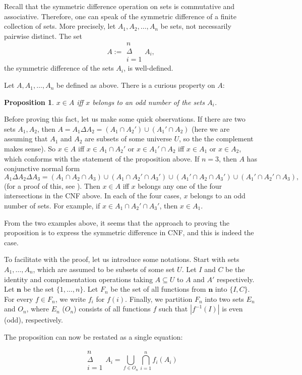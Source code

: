 \documentclass[12pt]{article}
\newtheorem{prop}{Proposition}
\newcommand{\symsum}[2]{\substack{ {#2} \\ \displaystyle{\Delta} \\ {#1} }}
\begin{document}
Recall that the symmetric difference operation on sets is commutative and associative.  Therefore, one can speak of the symmetric difference of a finite collection of sets.  More precisely, let $A_1,A_2,\ldots, A_n$ be sets, not necessarily pairwise distinct.  The set $$A:=\displaystyle{\symsum{i=1}{n} A_i},$$ the symmetric difference of the sets $A_i$, is well-defined.  

Let $A,A_1,\ldots,A_n$ be defined as above.  There is a curious property on $A$: 
\begin{prop} $x\in A$ iff $x$ belongs to an odd number of the sets $A_i$. \end{prop}
Before proving this fact, let us make some quick observations.  If there are two sets $A_1,A_2$, then $A=A_1\Delta A_2 = (A_1\cap A_2')\cup (A_1'\cap A_2)$ (here we are assuming that $A_1$ and $A_2$ are subsets of some universe $U$, so the the complement makes sense).  So $x\in A$ iff $x\in A_1\cap A_2'$ or $x\in A_1'\cap A_2$ iff $x\in A_1$ or $x\in A_2$, which conforms with the statement of the proposition above.  If $n=3$, then $A$ has conjunctive normal form $$A_1\Delta A_2\Delta A_3 = (A_1\cap A_2\cap A_3)\cup (A_1\cap A_2'\cap A_3')\cup (A_1'\cap A_2\cap A_3')\cup (A_1'\cap A_2'\cap A_3),$$ (for a proof of this, see ).  Then $x\in A$ iff $x$ belongs any one of the four intersections in the CNF above.  In each of the four cases, $x$ belongs to an odd number of sets.  For example, if $x\in A_1\cap A_2'\cap A_3'$, then $x\in A_1$.

From the two examples above, it seems that the approach to proving the proposition is to express the symmetric difference in CNF, and this is indeed the case.  

To facilitate with the proof, let us introduce some notations.  Start with sets $A_1,\ldots, A_n$, which are assumed to be subsets of some set $U$.  Let $I$ and $C$ be the identity and complementation operations taking $A\subseteq U$ to $A$ and $A'$ respectively.  Let $\mathbf{n}$ be the set $\lbrace 1,\ldots, n\rbrace$.    Let $F_n$ be the set of all functions from $\mathbf{n}$ into $\lbrace I,C\rbrace$.  For every $f\in F_n$, we write $f_i$ for $f(i)$.  Finally, we partition $F_n$ into two sets $E_n$ and $O_n$, where $E_n$ ($O_n$) consists of all functions $f$ such that $|f^{-1}(I)|$ is even (odd), respectively.

The proposition can now be restated as a single equation:

$$\displaystyle{\symsum{i=1}{n} A_i} = \bigcup_{f\in O_n} \bigcap_{i=1}^n f_i(A_i)$$
\end{document}
